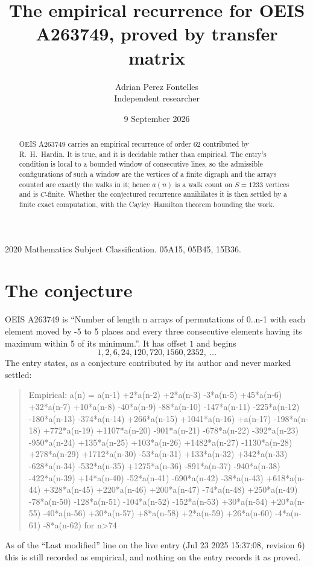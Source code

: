 \documentclass[11pt,a4paper]{article}
\title{The empirical recurrence for OEIS A263749, proved by transfer matrix}
\author{Adrian Perez Fontelles\\ \small Independent researcher}
\date{9 September 2026}
\theoremstyle{plain}
\theoremstyle{definition}
\begin{document}
\maketitle

\begin{abstract}
OEIS A263749 carries an empirical recurrence of order $62$ contributed by R.~H.~Hardin. It is
true, and it is decidable rather than empirical. The entry's condition is local to a bounded window of consecutive lines, so
the admissible configurations of such a window are the vertices of a finite digraph and the
arrays counted are exactly the walks in it; hence $a(n)$ is a walk count on $S=1233$ vertices
and is $C$-finite. Whether the conjectured recurrence annihilates it is then settled by a
finite exact computation, with the Cayley--Hamilton theorem bounding the work.
\end{abstract}

\noindent\small 2020 Mathematics Subject Classification. 05A15, 05B45, 15B36.\normalsize

\section{The conjecture}

OEIS A263749 is ``Number of length n arrays of permutations of 0..n-1 with each element moved by -5 to 5 places and every three consecutive elements having its maximum within 5 of its minimum.''. It has offset $1$ and begins
\[
1, 2, 6, 24, 120, 720, 1560, 2352,\ \dots
\]
The entry states, as a conjecture contributed by its author and never marked settled:
\begin{quote}
Empirical: a(n) = a(n-1) +2*a(n-2) +2*a(n-3) -3*a(n-5) +45*a(n-6) +32*a(n-7) +10*a(n-8) -40*a(n-9) -88*a(n-10) -147*a(n-11) -225*a(n-12) -180*a(n-13) -374*a(n-14) +266*a(n-15) +1041*a(n-16) +a(n-17) -198*a(n-18) +772*a(n-19) +1107*a(n-20) -901*a(n-21) -678*a(n-22) -392*a(n-23) -950*a(n-24) +135*a(n-25) +103*a(n-26) +1482*a(n-27) -1130*a(n-28) +278*a(n-29) +1712*a(n-30) -53*a(n-31) +133*a(n-32) +342*a(n-33) -628*a(n-34) -532*a(n-35) +1275*a(n-36) -891*a(n-37) -940*a(n-38) -422*a(n-39) +14*a(n-40) -52*a(n-41) -690*a(n-42) -38*a(n-43) +618*a(n-44) +328*a(n-45) +220*a(n-46) +200*a(n-47) -74*a(n-48) +250*a(n-49) -78*a(n-50) -128*a(n-51) -104*a(n-52) -152*a(n-53) +30*a(n-54) +20*a(n-55) -40*a(n-56) +30*a(n-57) +8*a(n-58) +2*a(n-59) +26*a(n-60) -4*a(n-61) -8*a(n-62) for n>74
\end{quote}
As of the ``Last modified'' line on the live entry (Jul 23 2025 15:37:08, revision 6) this is still
recorded as empirical, and nothing on the entry records it as proved.
\end{document}

